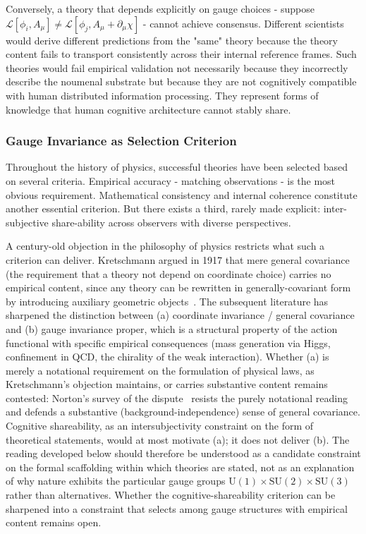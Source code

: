 \documentclass[11pt]{article}
\begin{document}
Conversely, a theory that depends explicitly on gauge choices - suppose $\mathcal{L}[\phi_i, A_\mu] \neq \mathcal{L}[\phi_j, A_\mu + \partial_\mu\chi]$ - cannot achieve consensus. Different scientists would derive different predictions from the "same" theory because the theory content fails to transport consistently across their internal reference frames. Such theories would fail empirical validation not necessarily because they incorrectly describe the noumenal substrate but because they are not cognitively compatible with human distributed information processing. They represent forms of knowledge that human cognitive architecture cannot stably share.

\subsubsection{Gauge Invariance as Selection Criterion}

Throughout the history of physics, successful theories have been selected based on several criteria. Empirical accuracy - matching observations - is the most obvious requirement. Mathematical consistency and internal coherence constitute another essential criterion. But there exists a third, rarely made explicit: inter-subjective share-ability across observers with diverse perspectives.

A century-old objection in the philosophy of physics restricts what such a criterion can deliver. Kretschmann argued in 1917 that mere general covariance (the requirement that a theory not depend on coordinate choice) carries no empirical content, since any theory can be rewritten in generally-covariant form by introducing auxiliary geometric objects~\cite{Kretschmann1917}. The subsequent literature has sharpened the distinction between (a) coordinate invariance / general covariance and (b) gauge invariance proper, which is a structural property of the action functional with specific empirical consequences (mass generation via Higgs, confinement in QCD, the chirality of the weak interaction). Whether (a) is merely a notational requirement on the formulation of physical laws, as Kretschmann's objection maintains, or carries substantive content remains contested: Norton's survey of the dispute~\cite{Norton1993} resists the purely notational reading and defends a substantive (background-independence) sense of general covariance. Cognitive shareability, as an intersubjectivity constraint on the form of theoretical statements, would at most motivate (a); it does not deliver (b). The reading developed below should therefore be understood as a candidate constraint on the formal scaffolding within which theories are stated, not as an explanation of why nature exhibits the particular gauge groups $\mathrm{U}(1) \times \mathrm{SU}(2) \times \mathrm{SU}(3)$ rather than alternatives. Whether the cognitive-shareability criterion can be sharpened into a constraint that selects among gauge structures with empirical content remains open.
\end{document}
